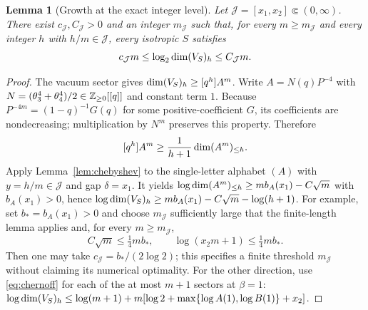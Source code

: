 \documentclass[10pt,a4paper]{article}
\numberwithin{equation}{section}
\newtheorem{lemma}[theorem]{Lemma}\newtheorem{proposition}[theorem]{Proposition}
\theoremstyle{remark}\newtheorem{remark}[theorem]{Remark}\newtheorem{question}[theorem]{Question}
\begin{document}
\begin{lemma}[Growth at the exact integer level]\label{lem:linear}
Let $\mathcal J=[x_1,x_2]\Subset(0,\infty)$. There exist $c_{\mathcal J},C_{\mathcal J}>0$ and an integer $m_{\mathcal J}$ such that, for every $m\ge m_{\mathcal J}$ and every \emph{integer $h$} with $h/m\in \mathcal J$, every isotropic $S$ satisfies
\begin{equation}\label{eq:linear}
c_{\mathcal J}m\le\log_2\operatorname{dim}(V_S)_h\le C_{\mathcal J}m.
\end{equation}
\end{lemma}
\begin{proof}
The vacuum sector gives $\operatorname{dim}(V_S)_h\ge[q^h]A^m$. Write $A=N(q)P^{-4}$ with $N=(\theta_3^4+\theta_4^4)/2\in\mathbb Z_{\ge0}[[q]]$ and constant term $1$. Because $P^{-4m}=(1-q)^{-1}G(q)$ for some positive-coefficient $G$, its coefficients are nondecreasing; multiplication by $N^m$ preserves this property. Therefore
\[
[q^h]A^m\ge\frac{1}{h+1}\operatorname{dim}(A^m)_{\le h}.
\]
Apply Lemma~\ref{lem:chebyshev} to the single-letter alphabet $(A)$ with $y=h/m\in \mathcal J$ and gap $\delta=x_1$. It yields $\log\operatorname{dim}(A^m)_{\le h}\ge m b_A(x_1)-C\sqrt m$ with $b_A(x_1)>0$, hence $\log\operatorname{dim}(V_S)_h\ge mb_A(x_1)-C\sqrt m-\log(h+1)$. For example, set $b_*=b_A(x_1)>0$ and choose $m_{\mathcal J}$ sufficiently large that the finite-length lemma applies and, for every $m\ge m_{\mathcal J}$,
\[
C\sqrt m\le\tfrac14mb_*,\qquad \log(x_2m+1)\le\tfrac14mb_*.
\]
Then one may take $c_{\mathcal J}=b_*/(2\log2)$; this specifies a finite threshold $m_{\mathcal J}$ without claiming its numerical optimality. For the other direction, use \eqref{eq:chernoff} for each of the at most $m+1$ sectors at $\beta=1$: $\log\operatorname{dim}(V_S)_h\le\log(m+1)+m[\log2+\max\{\log A(1),\log B(1)\}+x_2]$.\end{proof}
\end{document}
